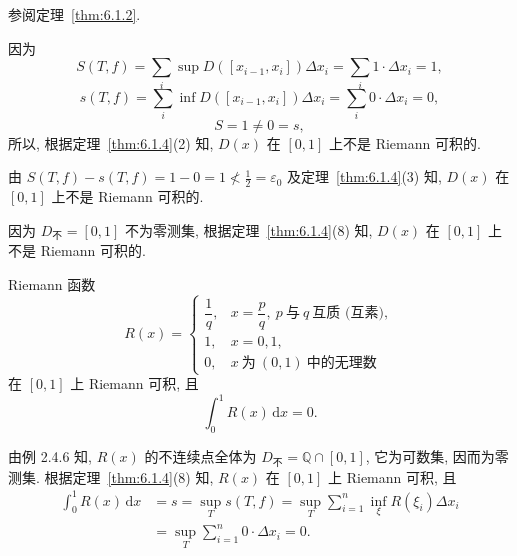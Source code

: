 \begin{solution}[证法 1]
参阅定理~\ref{thm:6.1.2}.
\end{solution}

\begin{solution}[证法 2]
因为
\[
S(T,f)=\sum_{i}\sup D([x_{i-1},x_{i}])\Delta x_{i}=\sum_{i}1\cdot\Delta x_{i}=1,
\]
\[
s(T,f)=\sum_{i}\inf D([x_{i-1},x_{i}])\Delta x_{i}=\sum_{i}0\cdot\Delta x_{i}=0,
\]
\[
S=1\neq 0=s,
\]
所以, 根据定理~\ref{thm:6.1.4}(2) 知, $D(x)$ 在 $[0,1]$ 上不是 Riemann 可积的.
\end{solution}

\begin{solution}[证法 3]
由 $S(T,f)-s(T,f)=1-0=1\not<\frac{1}{2}=\varepsilon_{0}$ 及定理~\ref{thm:6.1.4}(3) 知, $D(x)$ 在 $[0,1]$ 上不是 Riemann 可积的.
\end{solution}

\begin{solution}[证法 4]
因为 $D_{\text{不}}=[0,1]$ 不为零测集, 根据定理~\ref{thm:6.1.4}(8) 知, $D(x)$ 在 $[0,1]$ 上不是 Riemann 可积的.
\end{solution}

\begin{example}\label{ex:6.1.2}
Riemann 函数
\[
R(x)=\begin{cases}\dfrac{1}{q},&x=\dfrac{p}{q},\ p\ \text{与}\ q\ \text{互质 (互素)},\\[2mm]1,&x=0,1,\\[1mm]0,&x\ \text{为}\ (0,1)\ \text{中的无理数}\end{cases}
\]
在 $[0,1]$ 上 Riemann 可积, 且
\[
\int_{0}^{1}R(x)\,\mathrm{d}x=0.
\]
\end{example}

\begin{solution}[证法 1]
由例 2.4.6 知, $R(x)$ 的不连续点全体为 $D_{\text{不}}=\mathbb{Q}\cap[0,1]$, 它为可数集, 因而为零测集. 根据定理~\ref{thm:6.1.4}(8) 知, $R(x)$ 在 $[0,1]$ 上 Riemann 可积, 且
\begin{align*}
\int_{0}^{1}R(x)\,\mathrm{d}x&=s=\sup_{T}s(T,f)=\sup_{T}\sum_{i=1}^{n}\inf_{\xi}R(\xi_{i})\Delta x_{i}\\
&=\sup_{T}\sum_{i=1}^{n}0\cdot\Delta x_{i}=0.
\end{align*}
\end{solution}

